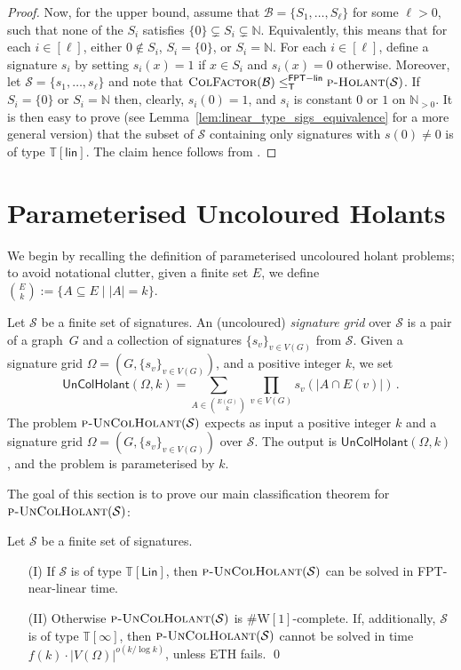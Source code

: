 \documentclass[authorcolumns,numberwithinsect]{no-lipics-v2022}
\newcommand{\W}{\mathrm{W}}
\newcommand{\fptlinred}{\leq^{\mathsf{FPT-lin}}_{\mathsf{T}}}
\begin{document}
\begin{proof}
Now, for the upper bound, assume that $\mathcal{B}=\{S_1,\dots,S_\ell\}$ for some $\ell>0$, such that none of the $S_i$ satisfies $\{0\}\subsetneq S_i \subsetneq \mathbb{N}$. Equivalently, this means that for each $i\in[\ell]$, either $0\notin S_i$, $S_i=\{0\}$, or $S_i=\mathbb{N}$. For each $i\in [\ell]$, define a signature $s_i$ by setting $s_i(x)=1$ if $x\in S_i$ and $s_i(x)=0$ otherwise. Moreover, let $\mathcal{S}=\{s_1,\dots,s_\ell\}$ and note that $\textsc{ColFactor}(\mathcal{B}) \fptlinred \textsc{p-Holant}(\mathcal{S})$. 
If $S_i=\{0\}$ or $S_i=\mathbb{N}$ then, clearly, $s_i(0)=1$, and $s_i$ is constant $0$ or $1$ on $\mathbb{N}_{>0}$. It is then easy to prove (see Lemma~\ref{lem:linear_type_sigs_equivalence} for a more general version) that the subset of $\mathcal{S}$ containing only signatures with $s(0)\neq 0$ is of type $\mathbb{T}[\mathsf{lin}]$. The claim hence follows from .
\end{proof}

\section{Parameterised Uncoloured Holants}\label{sec:uncoloured}
We begin by recalling the definition of parameterised uncoloured holant problems; to avoid notational clutter, given a finite set $E$, we define $\binom{E}{k}:=\{A \subseteq E \mid |A| = k\}$.
\begin{definition}
    Let $\mathcal{S}$ be a finite set of signatures.
    An (uncoloured) \emph{signature grid} over $\mathcal{S}$ is a pair of a graph~$G$ and a collection of signatures $\{s_v\}_{v\in V(G)}$ from $\mathcal{S}$. Given a signature grid $\Omega=(G,\{s_v\}_{v\in V(G)})$, and a positive integer $k$, we set
    \[ \mathsf{UnColHolant}(\Omega,k) = \sum_{A \in \binom{E(G)}{k}} \prod_{v\in V(G)} s_v(|A \cap E(v)|) \,.\]
    The problem $\text{\sc{p-UnColHolant}}(\mathcal{S})$ expects as input a positive integer $k$ and a signature grid $\Omega=(G,\{s_v\}_{v\in V(G)})$ over $\mathcal{S}$. The output is $\mathsf{UnColHolant}(\Omega,k)$, and the problem is parameterised by $k$. 
\end{definition}

The goal of this section is to prove our main classification theorem for $\text{\sc{p-UnColHolant}}(\mathcal{S})$:

\begin{theorem}\label{thm:main_uncol_restate}
    Let $\mathcal{S}$ be a finite set of signatures. 
    \begin{itemize}
        \item[(I)] If $\mathcal{S}$ is of type $\mathbb{T}[\mathsf{Lin}]$, then $\text{\sc{p-UnColHolant}}(\mathcal{S})$ can be solved in FPT-near-linear time.
        \item[(II)] Otherwise $\text{\sc{p-UnColHolant}}(\mathcal{S})$ is $\#\W[1]$-complete. If, additionally, $\mathcal{S}$ is of type $\mathbb{T}[\infty]$, then $\text{\sc{p-UnColHolant}}(\mathcal{S})$ cannot be solved in time $f(k)\cdot |V(\Omega)|^{o(k/\log k)}$, unless ETH fails. \qed
    \end{itemize}
\end{theorem}
\end{document}
